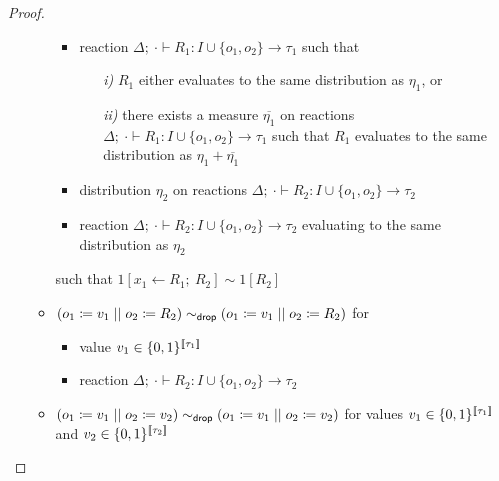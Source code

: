 \begin{proof}
\begin{itemize}
\begin{itemize}
\begin{itemize}
\item reaction $\Delta; \ \cdot \vdash R_1 : I \cup \{o_1,o_2\} \to \tau_1$ such that
\begin{itemize}
\item[\emph{i)}] $R_1$ either evaluates to the same distribution as $\eta_1$, or
\item[\emph{ii)}] there exists a measure $\overline{\eta_1}$ on reactions $\Delta; \ \cdot \vdash R_1 : I \cup \{o_1,o_2\} \to \tau_1$ such that $R_1$ evaluates to the same distribution as $\eta_1 + \overline{\eta_1}$
\end{itemize}
\item distribution $\eta_2$ on reactions $\Delta; \ \cdot \vdash R_2 : I \cup \{o_1,o_2\} \to \tau_2$
\item reaction $\Delta; \ \cdot \vdash R_2 : I \cup \{o_1,o_2\} \to \tau_2$ evaluating to the same distribution as $\eta_2$
\end{itemize}
such that $1[x_1 \leftarrow R_1; \ R_2] \sim 1[R_2]$
\item $(o_1 \coloneqq v_1 \; || \; o_2 \coloneqq R_2) \sim_{\mathsf{drop}} (o_1 \coloneqq v_1 \; || \; o_2 \coloneqq R_2)$ for
\begin{itemize}
\item value $v_1 \in \{0,1\}^{\llbracket \tau_1 \rrbracket}$
\item reaction $\Delta; \ \cdot \vdash R_2 : I \cup \{o_1,o_2\} \to \tau_2$
\end{itemize}
\item $(o_1 \coloneqq v_1 \; || \; o_2 \coloneqq v_2) \sim_{\mathsf{drop}} (o_1 \coloneqq v_1 \; || \; o_2 \coloneqq v_2)$ for values $v_1 \in \{0,1\}^{\llbracket \tau_1 \rrbracket}$ and $v_2 \in \{0,1\}^{\llbracket \tau_2 \rrbracket}$
\end{itemize}
\end{itemize}
\end{proof}

